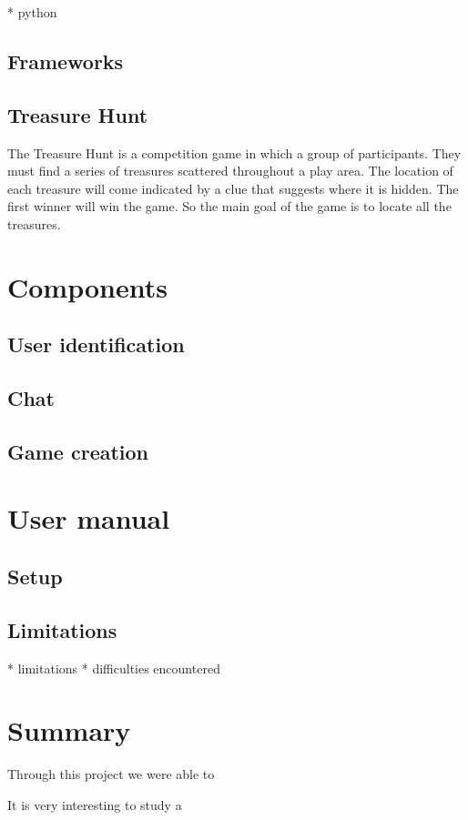 \documentclass{article}
\begin{document}
* python

\subsection{Frameworks}

\subsection{Treasure Hunt}

The Treasure Hunt is a competition game in which a group of participants. They must find a series of treasures scattered throughout a play area. The location of each treasure will come indicated by a clue that suggests where it is hidden. The first winner will win the game. So the main goal of the game is to locate all the treasures.

\section{Components} %

\subsection{User identification}

\subsection{Chat}

\subsection{Game creation}

\section{User manual}

\subsection{Setup}

\newpage

\subsection{Limitations}

* limitations
* difficulties encountered

\section{Summary}
Through this project we were able to

It is very interesting to study a 
\end{document}
